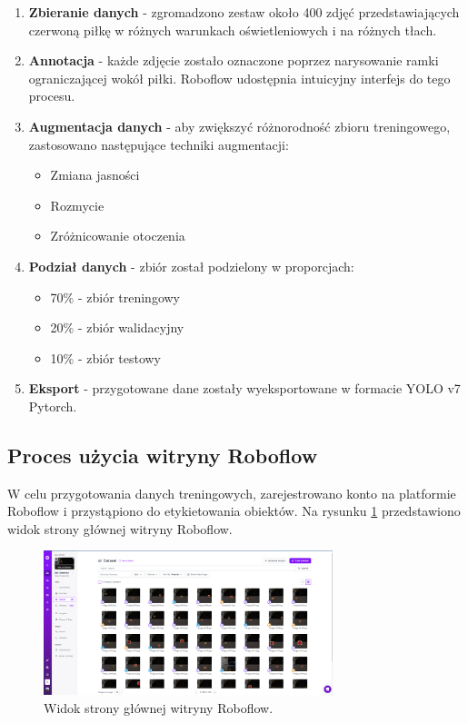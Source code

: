 \documentclass[a4paper,twoside,12pt]{book}
\begin{document}
\begin{enumerate}
	\item \textbf{Zbieranie danych} - zgromadzono zestaw około 400 zdjęć przedstawiających czerwoną piłkę w różnych warunkach oświetleniowych i na różnych tłach.
	
	\item \textbf{Annotacja} - każde zdjęcie zostało oznaczone poprzez narysowanie ramki ograniczającej wokół piłki. Roboflow udostępnia intuicyjny interfejs do tego procesu.
	
	\item \textbf{Augmentacja danych} - aby zwiększyć różnorodność zbioru treningowego, zastosowano następujące techniki augmentacji:
	\begin{itemize}
		\item Zmiana jasności 
		\item Rozmycie
		\item Zróżnicowanie otoczenia
	\end{itemize}
	
	\item \textbf{Podział danych} - zbiór został podzielony w proporcjach:
	\begin{itemize}
		\item 70\% - zbiór treningowy
		\item 20\% - zbiór walidacyjny
		\item 10\% - zbiór testowy
	\end{itemize}
	
	\item \textbf{Eksport} - przygotowane dane zostały wyeksportowane w formacie YOLO v7 Pytorch.
\end{enumerate}

\newpage

\subsection{Proces użycia witryny Roboflow}
W celu przygotowania danych treningowych, zarejestrowano konto na platformie Roboflow i przystąpiono do etykietowania obiektów. Na rysunku \ref{fig:roboflow-main} przedstawiono widok strony głównej witryny Roboflow.

\begin{figure}[h]
	\centering
	\includegraphics[width=0.75\textwidth]{Images/Roboflow/mainscreen.png}
	\caption{Widok strony głównej witryny Roboflow.}
	\label{fig:roboflow-main}
\end{figure}
\end{document}
